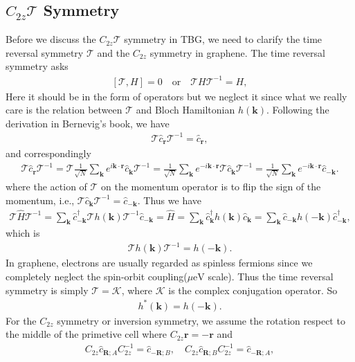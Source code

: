 \documentclass[10pt, oneside]{article}
\newcommand{\mr}[1]{\mathrm{#1}}
\newcommand{\p}[1]{\left(#1\right)}
\newcommand{\bb}[1]{\left[#1\right]}
\begin{document}
\subsection{$C_{2z} \mathcal{T} $ Symmetry}
Before we discuss the \(C_{2z} \mathcal{T}\) symmetry in TBG, we need to clarify the time reversal symmetry \(\mathcal{T}\) and the \(C_{2z}\) symmetry in graphene. The time reversal symmetry asks
\begin{align}
	\bb{\mathcal{T}, H} = 0 \quad \mr{or} \quad \mathcal{T} H \mathcal{T}^{-1} = H,
\end{align}
Here it should be in the form of operators but we neglect it since what we really care is the relation between \(\mathcal{T}\) and Bloch Hamiltonian \(h\p{\bm{k}}\). Following the derivation in Bernevig's book, we have 
\begin{align}
	\mathcal{T} \hat{c}_{\bm{r}} \mathcal{T}^{-1} = \hat{c}_{\bm{r}},
\end{align}
and correspondingly 
\begin{align}
	\mathcal{T} \hat{c}_{\bm{r}} \mathcal{T}^{-1} = \mathcal{T} \frac{1}{\sqrt{N}} \sum_{\bm{k}} e^{i \bm{k} \cdot \bm{r}} \hat{c}_{\bm{k}} \mathcal{T}^{-1} = \frac{1}{\sqrt{N}} \sum_{\bm{k}} e^{ - i \bm{k} \cdot \bm{r}} \mathcal{T} \hat{c}_{\bm{k}} \mathcal{T}^{-1} = \frac{1}{\sqrt{N}} \sum_{\bm{k}} e^{ - i \bm{k} \cdot \bm{r}} \hat{c}_{- \bm{k}}.
\end{align}
where the action of \(\mathcal{T}\) on the momentum operator is to flip the sign of the momentum, i.e., \(\mathcal{T} \hat{c}_{\bm{k}} \mathcal{T}^{-1} = \hat{c}_{- \bm{k}}\). Thus we have
\begin{align}
	\mathcal{T} \hat{H} \mathcal{T}^{-1} = \sum_{\bm{k}} \hat{c}^\dagger_{-\bm{k}} \mathcal{T} h\p{\bm{k}} \mathcal{T}^{-1} \hat{c}_{-\bm{k}} = \hat{H} = \sum_{\bm{k}} \hat{c}^\dagger_{\bm{k}} h\p{\bm{k}} \hat{c}_{\bm{k}} = \sum_{\bm{k}} \hat{c}_{- \bm{k}} h \p{- \bm{k}} \hat{c}^\dagger_{- \bm{k}},
\end{align}
which is 
\begin{align}
	\boxed{\mathcal{T} h\p{\bm{k}} \mathcal{T}^{-1} = h\p{- \bm{k}}}.
\end{align}
In graphene, electrons are usually regarded as spinless fermions since we completely neglect the spin-orbit coupling(\(\mu \mr{eV}\) scale). Thus the time reversal symmetry is simply \(\mathcal{T} = \mathcal{K}\), where \(\mathcal{K}\) is the complex conjugation operator. So 
\begin{align}
	\boxed{h^* \p{\bm{k}} = h\p{- \bm{k}}}.
\end{align}
For the \(C_{2z}\) symmetry or inversion symmetry, we assume the rotation respect to the middle of the primetive cell where \(C_{2z} \bm{r} = - \bm{r}\) and 
\begin{align}
	C_{2z} \hat{c}_{\bm{R};A} C_{2z}^{-1} = \hat{c}_{-\bm{R};B},\quad C_{2z} \hat{c}_{\bm{R};B} C_{2z}^{-1} = \hat{c}_{-\bm{R};A},
\end{align}
\end{document}
